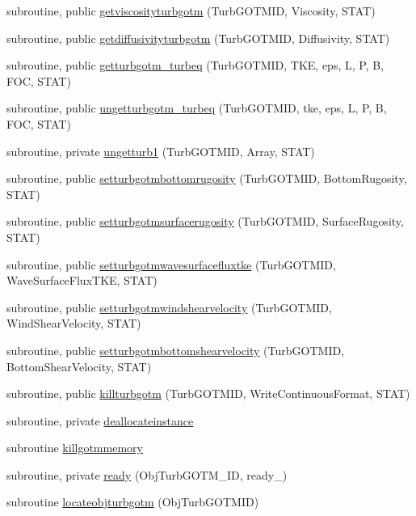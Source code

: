 \begin{DoxyCompactItemize}
\item 
subroutine, public \mbox{\hyperlink{namespacemoduleturbgotm_a96d85a3644e939450eb599e84624f5b3}{getviscosityturbgotm}} (Turb\+G\+O\+T\+M\+ID, Viscosity, S\+T\+AT)
\item 
subroutine, public \mbox{\hyperlink{namespacemoduleturbgotm_a44eb11a0b54701f863dfae9be213de0e}{getdiffusivityturbgotm}} (Turb\+G\+O\+T\+M\+ID, Diffusivity, S\+T\+AT)
\item 
subroutine, public \mbox{\hyperlink{namespacemoduleturbgotm_a087db16b86a3a5c9670ca783b6075e65}{getturbgotm\+\_\+turbeq}} (Turb\+G\+O\+T\+M\+ID, T\+KE, eps, L, P, B, F\+OC, S\+T\+AT)
\item 
subroutine, public \mbox{\hyperlink{namespacemoduleturbgotm_a4858630313fbbb17b65257d59f9e67ca}{ungetturbgotm\+\_\+turbeq}} (Turb\+G\+O\+T\+M\+ID, tke, eps, L, P, B, F\+OC, S\+T\+AT)
\item 
subroutine, private \mbox{\hyperlink{namespacemoduleturbgotm_ab21e7a83e00f82db5a1c214bd784426a}{ungetturb1}} (Turb\+G\+O\+T\+M\+ID, Array, S\+T\+AT)
\item 
subroutine, public \mbox{\hyperlink{namespacemoduleturbgotm_a2596446f2aa54a9db3ed26b9552952d6}{setturbgotmbottomrugosity}} (Turb\+G\+O\+T\+M\+ID, Bottom\+Rugosity, S\+T\+AT)
\item 
subroutine, public \mbox{\hyperlink{namespacemoduleturbgotm_ac71371400c754c4786f6914ccc6d6c70}{setturbgotmsurfacerugosity}} (Turb\+G\+O\+T\+M\+ID, Surface\+Rugosity, S\+T\+AT)
\item 
subroutine, public \mbox{\hyperlink{namespacemoduleturbgotm_a868b912c54f8467afdf5608913e56f87}{setturbgotmwavesurfacefluxtke}} (Turb\+G\+O\+T\+M\+ID, Wave\+Surface\+Flux\+T\+KE, S\+T\+AT)
\item 
subroutine, public \mbox{\hyperlink{namespacemoduleturbgotm_acbaf0e58ab0ad4a29aca5101ed59bdea}{setturbgotmwindshearvelocity}} (Turb\+G\+O\+T\+M\+ID, Wind\+Shear\+Velocity, S\+T\+AT)
\item 
subroutine, public \mbox{\hyperlink{namespacemoduleturbgotm_a9e719059bf7bff5946e65a3d8157ada6}{setturbgotmbottomshearvelocity}} (Turb\+G\+O\+T\+M\+ID, Bottom\+Shear\+Velocity, S\+T\+AT)
\item 
subroutine, public \mbox{\hyperlink{namespacemoduleturbgotm_a59463567a7797fc2bb742f83929626b1}{killturbgotm}} (Turb\+G\+O\+T\+M\+ID, Write\+Continuous\+Format, S\+T\+AT)
\item 
subroutine, private \mbox{\hyperlink{namespacemoduleturbgotm_ab38c9de41229ce2e4ae46d12471c0a00}{deallocateinstance}}
\item 
subroutine \mbox{\hyperlink{namespacemoduleturbgotm_aad945eb0d5a2d67bc28f53a95bed4242}{killgotmmemory}}
\item 
subroutine, private \mbox{\hyperlink{namespacemoduleturbgotm_a8b59a232d6c61837f14e169cef43d695}{ready}} (Obj\+Turb\+G\+O\+T\+M\+\_\+\+ID, ready\+\_\+)
\item 
subroutine \mbox{\hyperlink{namespacemoduleturbgotm_a2445ccc2c59cf2ae892fd78dda123a3d}{locateobjturbgotm}} (Obj\+Turb\+G\+O\+T\+M\+ID)
\end{DoxyCompactItemize}

